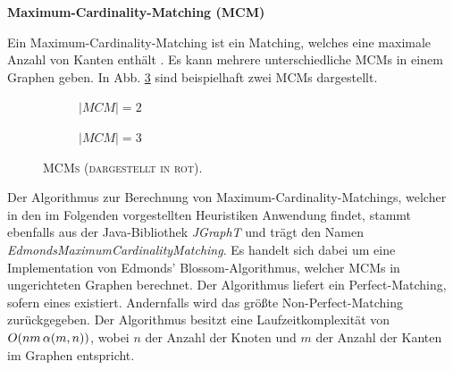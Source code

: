 \textbf{Maximum-Cardinality-Matching (MCM)}

Ein Maximum-Cardinality-Matching ist ein Matching, welches eine maximale Anzahl von Kanten enthält \cite{Gibbons1985}.
Es kann mehrere unterschiedliche MCMs in einem Graphen geben.
In Abb. \ref{fig:mcm_examples} sind beispielhaft zwei MCMs dargestellt.

\begin{figure}[H]
  \begin{subfigure}[b]{0.4\textwidth}
  \centering
  \caption{\textsc{$|MCM| = 2$}}
  \label{fig:mcm1}
  \end{subfigure}
  \hfill
  \begin{subfigure}[b]{0.4\textwidth}
  \centering
    \caption{\textsc{$|MCM| = 3$}}
    \label{fig:mcm_2}
  \end{subfigure}
  \caption{\textsc{MCMs (dargestellt in rot).}}
  \label{fig:mcm_examples}
\end{figure}

Der Algorithmus zur Berechnung von Maximum-Cardinality-Matchings, welcher in den im Folgenden
vorgestellten Heuristiken Anwendung findet, stammt ebenfalls aus der Java-Bibliothek \textit{JGraphT} \cite{JGraphT} und trägt
den Namen \textit{EdmondsMaximumCardinalityMatching}. Es handelt sich dabei um eine Implementation von Edmonds' Blossom-Algorithmus,
welcher MCMs in ungerichteten Graphen berechnet. Der Algorithmus liefert ein Perfect-Matching, sofern eines existiert.
Andernfalls wird das größte Non-Perfect-Matching zurückgegeben.
Der Algorithmus besitzt eine Laufzeitkomplexität von $O(nm \thinspace \alpha(m, n))$, wobei $n$ der Anzahl der Knoten
und $m$ der Anzahl der Kanten im Graphen entspricht.

